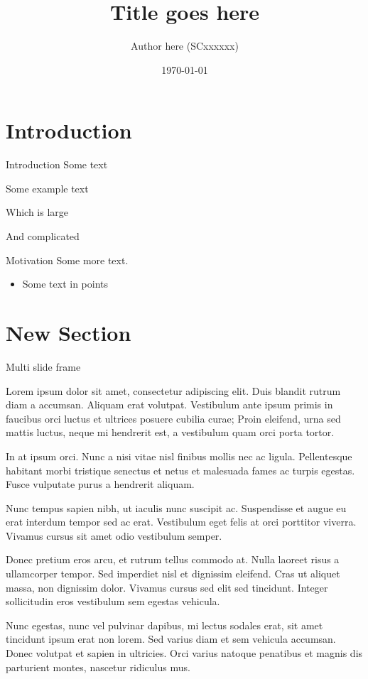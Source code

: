 \documentclass[10pt,xcolor=svgnames]{beamer} %
\title{Title goes here}
\author[Name]{Author here (SCxxxxxx)}
\institute[uni]{Course \\ Indian Institute of Space Science and Technology}
\date{\today} %
\begin{document}
\maketitle

\section{Introduction}
\begin{frame}{Introduction}
    Some text
    \begin{example}
        Some example text

        Which is large

        And complicated
    \end{example}
\end{frame}

\begin{frame}{Motivation}
    Some more text. \begin{itemize}
        \item Some text in points
    \end{itemize}
\end{frame}


\section{New Section}

\begin{frame}[allowframebreaks]{Multi slide frame}
    

Lorem ipsum dolor sit amet, consectetur adipiscing elit. Duis blandit rutrum
diam a accumsan. Aliquam erat volutpat. Vestibulum ante ipsum primis in faucibus
orci luctus et ultrices posuere cubilia curae; Proin eleifend, urna sed mattis
luctus, neque mi hendrerit est, a vestibulum quam orci porta tortor.

In at ipsum orci. Nunc a nisi vitae nisl finibus mollis nec ac ligula.
Pellentesque habitant morbi tristique senectus et netus et malesuada fames ac
turpis egestas. Fusce vulputate purus a hendrerit aliquam.

Nunc tempus sapien nibh, ut iaculis nunc suscipit ac. Suspendisse et augue eu
erat interdum tempor sed ac erat. Vestibulum eget felis at orci porttitor
viverra. Vivamus cursus sit amet odio vestibulum semper.

\framebreak

Donec pretium eros arcu, et rutrum tellus commodo at. Nulla laoreet risus a
ullamcorper tempor. Sed imperdiet nisl et dignissim eleifend. Cras ut aliquet
massa, non dignissim dolor. Vivamus cursus sed elit sed tincidunt. Integer
sollicitudin eros vestibulum sem egestas vehicula. 

Nunc egestas, nunc vel pulvinar dapibus, mi lectus sodales erat, sit amet
tincidunt ipsum erat non lorem. Sed varius diam et sem vehicula accumsan. Donec
volutpat et sapien in ultricies. Orci varius natoque penatibus et magnis dis
parturient montes, nascetur ridiculus mus.
    
\end{frame}
\end{document}

